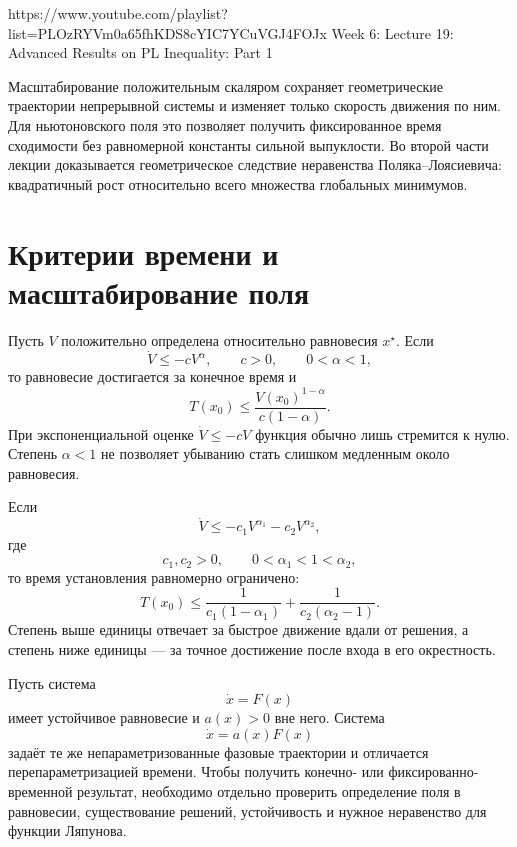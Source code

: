 
\sourcevideo
    {https://www.youtube.com/playlist?list=PLOzRYVm0a65fhKDS8cYIC7YCuVGJ4FOJx}
    {Week 6: Lecture 19: Advanced Results on PL Inequality: Part 1}

Масштабирование положительным скаляром сохраняет геометрические
траектории непрерывной системы и изменяет только скорость движения по
ним. Для ньютоновского поля это позволяет получить фиксированное время
сходимости без равномерной константы сильной выпуклости. Во второй
части лекции доказывается геометрическое следствие неравенства
Поляка--Лоясиевича: квадратичный рост относительно всего множества
глобальных минимумов.

\section{Критерии времени и масштабирование поля}

Пусть \(V\) положительно определена относительно равновесия
\(x^\star\). Если
\[
    \dot V\le-cV^\alpha,
    \qquad
    c>0,
    \qquad
    0<\alpha<1,
\]
то равновесие достигается за конечное время и
\[
    T(x_0)
    \le
    \frac{V(x_0)^{1-\alpha}}{c(1-\alpha)}.
\]
При экспоненциальной оценке \(\dot V\le-cV\) функция обычно лишь
стремится к нулю. Степень \(\alpha<1\) не позволяет убыванию стать
слишком медленным около равновесия.

Если
\[
    \dot V
    \le
    -c_1V^{\alpha_1}
    -c_2V^{\alpha_2},
\]
где
\[
    c_1,c_2>0,
    \qquad
    0<\alpha_1<1<\alpha_2,
\]
то время установления равномерно ограничено:
\[
    T(x_0)
    \le
    \frac1{c_1(1-\alpha_1)}
    +
    \frac1{c_2(\alpha_2-1)}.
\]
Степень выше единицы отвечает за быстрое движение вдали от решения,
а степень ниже единицы --- за точное достижение после входа в его
окрестность.

Пусть система
\[
    \dot x=F(x)
\]
имеет устойчивое равновесие и \(a(x)>0\) вне него. Система
\[
    \dot x=a(x)F(x)
\]
задаёт те же непараметризованные фазовые траектории и отличается
перепараметризацией времени. Чтобы получить конечно- или
фиксированно-временной результат, необходимо отдельно проверить
определение поля в равновесии, существование решений, устойчивость и
нужное неравенство для функции Ляпунова.


